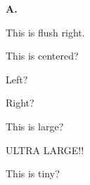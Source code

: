 \documentclass{article}
\begin{document}
    \textbf{A.}
    
    This is flush right.



    \begin{center}
    

        This is centered?


    \end{center}




    \begin{flushleft}
    

        Left?
    

    \end{flushleft}



    \begin{flushright}
        
    

        Right?
    

    \end{flushright}



    \begin{large}

    
        This is large?   
    

    \end{large}





    \begin{Large}
    

        ULTRA LARGE!!
    

    \end{Large}



    \begin{small}
    

        This is tiny?
    


    \end{small}
\end{document}
